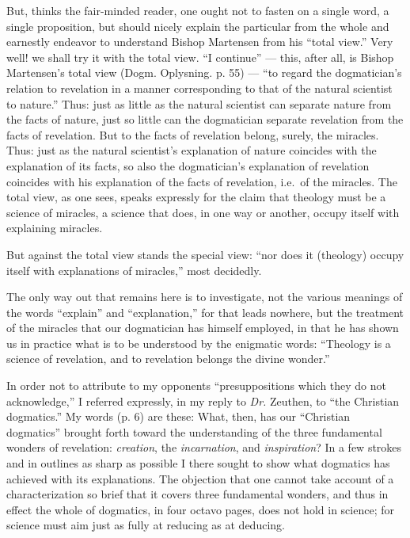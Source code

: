 \documentclass[12pt]{book}
\newcommand{\opage}[1]{\marginnote{\footnotesize\textit{[#1]}}}
\begin{document}
But, thinks the fair-minded reader, one ought not to fasten on a single word, a single proposition, but should nicely explain the particular from the whole and earnestly endeavor to understand Bishop Martensen from his ``total view.'' Very well! we shall try it with the total view. ``I continue'' --- this, after all, is Bishop Martensen's total view (Dogm. Oplysning. p. 55) --- ``to regard the dogmatician's relation to revelation in a manner corresponding to that of the natural scientist to nature.'' Thus: just as little as the natural scientist can separate nature from the facts of nature, just so little can the dogmatician separate
\opage{84}\setcounter{footnote}{0}%
revelation from the facts of revelation. But to the facts of revelation belong, surely, the miracles. Thus: just as the natural scientist's explanation of nature coincides with the explanation of its facts, so also the dogmatician's explanation of revelation coincides with his explanation of the facts of revelation, i.e.\ of the miracles. The total view, as one sees, speaks expressly for the claim that theology must be a science of miracles, a science that does, in one way or another, occupy itself with explaining miracles.

But against the total view stands the special view: ``nor does it (theology) occupy itself with explanations of miracles,'' most decidedly.

The only way out that remains here is to investigate, not the various meanings of the words ``explain'' and ``explanation,'' for that leads nowhere, but the treatment of the miracles that our dogmatician has himself employed, in that he has shown us in practice what is to be understood by the enigmatic words: ``Theology is a science of revelation, and to revelation belongs the divine wonder.''

In order not to attribute to my opponents ``presuppositions which they do not acknowledge,'' I referred expressly, in my reply to \textit{Dr.} Zeuthen, to ``the Christian dogmatics.'' My words (p. 6) are these: What, then, has our ``Christian dogmatics'' brought forth toward the understanding of the three fundamental wonders of revelation: \emph{creation}, the \emph{incarnation}, and \emph{inspiration}? In a few strokes and in outlines as sharp as possible I there sought to show what dogmatics has achieved with its explanations. The objection that one cannot take account of a characterization so brief that it covers three fundamental wonders, and thus in effect the whole of dogmatics, in four octavo pages, does not hold in science; for science must aim just as fully at reducing as at deducing.
\end{document}
